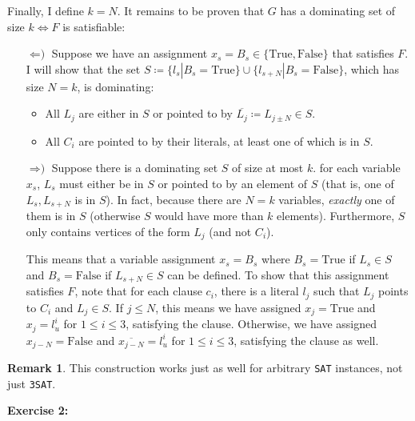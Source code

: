 \documentclass{amsart}
\theoremstyle{plain}
\theoremstyle{definition}
\newtheorem*{rk}{\textbf{Remark}}
\begin{document}
    Finally, I define $k = N$.
    It remains to be proven that $G$ has a dominating set of size $k \iff F$ is satisfiable:


    \begin{itemize}

        \item[$\Longleftarrow\text{)}$] Suppose we have an assignment $x_s = B_s \in \{\text{True}, \text{False}\}$
        that satisfies $F$.
        I will show that the set $S \coloneqq \{l_s | B_s = \text{True}\} \cup \{l_{s+N} | B_s = \text{False}\}$,
        which has size $N=k$, is dominating:
        \begin{itemize}
            \item All $L_j$ are either in $S$ or pointed to by $ \overline{L_j} \coloneqq L_{j \pm N} \in S$.
            \item All $C_i$ are pointed to by their literals, at least one of which is in $S$.
        \end{itemize}

        \item[$\Longrightarrow\text{)}$] Suppose there is a dominating set $S$ of size at most $k$.
        for each variable $x_s$, $L_s$ must either be in $S$ or pointed to by an element of $S$
        (that is, one of $L_s, L_{s+N}$ is in $S$). In fact, because there are $N=k$ variables,
        \emph{exactly} one of them is in $S$ (otherwise $S$ would have more than $k$ elements).
        Furthermore, $S$ only contains vertices of the form $L_j$ (and not $C_i$).

        This means that a variable assignment $x_s = B_s$ where $B_s = \text{True}$
        if $L_s \in S$ and $B_s = \text{False}$ if $L_{s+N} \in S$ can be defined.
        To show that this assignment satisfies $F$, note that for each clause $c_i$, there is
        a literal $l_j$ such that $L_j$ points to $C_i$ and $L_j \in S$.
        If $j \leq N$, this means we have assigned $x_j = \text{True}$ and $x_j = l^i_u$ for $1 \leq i \leq 3$,
        satisfying the clause.
        Otherwise, we have assigned $x_{j-N} = \text{False}$ and $\overline{x_{j-N}} = l^i_u$ for $1 \leq i \leq 3$,
        satisfying the clause as well.

    \end{itemize}

    \begin{rk}
        This construction works just as well for arbitrary \verb|SAT| instances, not just \verb|3SAT|.
    \end{rk}
    
    \textbf{Exercise 2:}


    \nocite{*}
    
    
\end{document}
